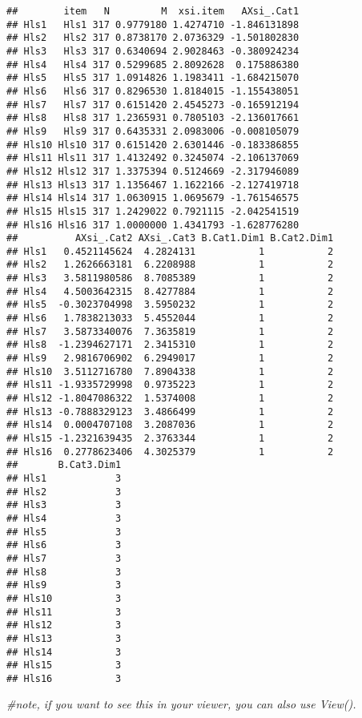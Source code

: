 \documentclass[
]{book}
\newenvironment{Shaded}{\begin{snugshade}}{\end{snugshade}}
\newcommand{\CommentTok}[1]{\textcolor[rgb]{0.56,0.35,0.01}{\textit{#1}}}
\begin{document}
\begin{verbatim}
##        item   N         M  xsi.item   AXsi_.Cat1
## Hls1   Hls1 317 0.9779180 1.4274710 -1.846131898
## Hls2   Hls2 317 0.8738170 2.0736329 -1.501802830
## Hls3   Hls3 317 0.6340694 2.9028463 -0.380924234
## Hls4   Hls4 317 0.5299685 2.8092628  0.175886380
## Hls5   Hls5 317 1.0914826 1.1983411 -1.684215070
## Hls6   Hls6 317 0.8296530 1.8184015 -1.155438051
## Hls7   Hls7 317 0.6151420 2.4545273 -0.165912194
## Hls8   Hls8 317 1.2365931 0.7805103 -2.136017661
## Hls9   Hls9 317 0.6435331 2.0983006 -0.008105079
## Hls10 Hls10 317 0.6151420 2.6301446 -0.183386855
## Hls11 Hls11 317 1.4132492 0.3245074 -2.106137069
## Hls12 Hls12 317 1.3375394 0.5124669 -2.317946089
## Hls13 Hls13 317 1.1356467 1.1622166 -2.127419718
## Hls14 Hls14 317 1.0630915 1.0695679 -1.761546575
## Hls15 Hls15 317 1.2429022 0.7921115 -2.042541519
## Hls16 Hls16 317 1.0000000 1.4341793 -1.628776280
##          AXsi_.Cat2 AXsi_.Cat3 B.Cat1.Dim1 B.Cat2.Dim1
## Hls1   0.4521145624  4.2824131           1           2
## Hls2   1.2626663181  6.2208988           1           2
## Hls3   3.5811980586  8.7085389           1           2
## Hls4   4.5003642315  8.4277884           1           2
## Hls5  -0.3023704998  3.5950232           1           2
## Hls6   1.7838213033  5.4552044           1           2
## Hls7   3.5873340076  7.3635819           1           2
## Hls8  -1.2394627171  2.3415310           1           2
## Hls9   2.9816706902  6.2949017           1           2
## Hls10  3.5112716780  7.8904338           1           2
## Hls11 -1.9335729998  0.9735223           1           2
## Hls12 -1.8047086322  1.5374008           1           2
## Hls13 -0.7888329123  3.4866499           1           2
## Hls14  0.0004707108  3.2087036           1           2
## Hls15 -1.2321639435  2.3763344           1           2
## Hls16  0.2778623406  4.3025379           1           2
##       B.Cat3.Dim1
## Hls1            3
## Hls2            3
## Hls3            3
## Hls4            3
## Hls5            3
## Hls6            3
## Hls7            3
## Hls8            3
## Hls9            3
## Hls10           3
## Hls11           3
## Hls12           3
## Hls13           3
## Hls14           3
## Hls15           3
## Hls16           3
\end{verbatim}

\begin{Shaded}
\begin{Highlighting}[]
\CommentTok{\#note, if you want to see this in your viewer, you can also use View().}
\end{Highlighting}
\end{Shaded}
\end{document}

